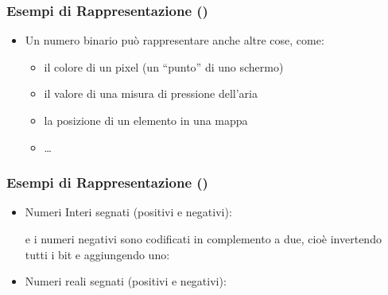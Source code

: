 \begin{frame}

    \frametitle{Esempi di Rappresentazione ()}

	\begin{itemize}[<+- | alert@+->]

		\item Un numero binario pu\`o rappresentare anche altre cose,
			come:

			\begin{itemize}[<+- | alert@+->]

        \item{il colore di un pixel (un ``punto'' di uno schermo)}\\

        \item{il valore di una misura di pressione dell'aria}

        \item{la posizione di un elemento in una mappa}

        \item \ldots

			\end{itemize}

	\end{itemize}

\end{frame}

\begin{frame}
    
    \frametitle{Esempi di Rappresentazione ()}

	\begin{itemize}

		\item{Numeri Interi segnati (positivi e negativi):

			\begin{center}
      \end{center}

			e i numeri negativi sono codificati in complemento a
			due, cio\`e invertendo tutti i bit e aggiungendo uno:

			\begin{center}
      \end{center}}

		\item{Numeri reali segnati (positivi e negativi):

			\begin{center}
      \end{center}}

	\end{itemize}

\end{frame}
